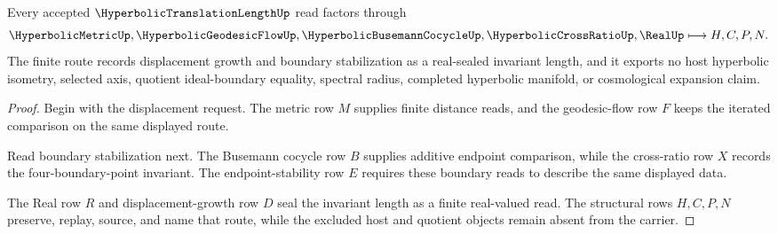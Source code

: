 \begin{theorem}
\label{thm:hyperbolic-translation-length-invariant-route}
Every accepted $\HyperbolicTranslationLengthUp$ read factors through
$$
\HyperbolicMetricUp,\HyperbolicGeodesicFlowUp,\HyperbolicBusemannCocycleUp,\HyperbolicCrossRatioUp,\RealUp \longmapsto H,C,P,N .
$$
The finite route records displacement growth and boundary stabilization as a real-sealed invariant length, and it exports no host hyperbolic isometry, selected axis, quotient ideal-boundary equality, spectral radius, completed hyperbolic manifold, or cosmological expansion claim.
\end{theorem}
\begin{proof}
Begin with the displacement request. The metric row $M$ supplies finite distance reads, and the geodesic-flow row $F$ keeps the iterated comparison on the same displayed route.

Read boundary stabilization next. The Busemann cocycle row $B$ supplies additive endpoint comparison, while the cross-ratio row $X$ records the four-boundary-point invariant. The endpoint-stability row $E$ requires these boundary reads to describe the same displayed data.

The Real row $R$ and displacement-growth row $D$ seal the invariant length as a finite real-valued read. The structural rows $H,C,P,N$ preserve, replay, source, and name that route, while the excluded host and quotient objects remain absent from the carrier.
\end{proof}




